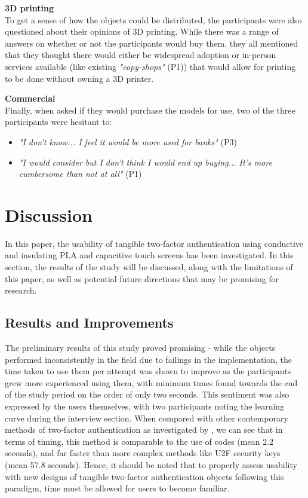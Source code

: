 \documentclass{l4proj}
\begin{document}
\textbf{3D printing}\\
To get a sense of how the objects could be distributed, the participants were also questioned about their opinions of 3D printing. While there was a range of answers on whether or not the participants would buy them, they all mentioned that they thought there would either be widespread adoption or in-person services available (like existing \textit{"copy-shops"} (P1)) that would allow for printing to be done without owning a 3D printer.

\textbf{Commercial}\\
Finally, when asked if they would purchase the models for use, two of the three participants were hesitant to:
\begin{itemize}
    \item \textit{"I don't know... I feel it would be more used for banks"} (P3)
    \item \textit{"I would consider but I don't think I would end up buying... It's more cumbersome than not at all"} (P1)
\end{itemize}

\chapter{Discussion} 

In this paper, the usability of tangible two-factor authentication using conductive and insulating PLA and capacitive touch screens has been investigated. In this section, the results of the study will be discussed, along with the limitations of this paper, as well as potential future directions that may be promising for research.

\section{Results and Improvements}

The preliminary results of this study proved promising - while the objects performed inconsistently in the field due to failings in the implementation, the time taken to use them per attempt was shown to improve as the participants grew more experienced using them, with minimum times found towards the end of the study period on the order of only two seconds. This sentiment was also expressed by the users themselves, with two participants noting the learning curve during the interview section. When compared with other contemporary methods of two-factor authentication as investigated by \cite{reese2019usability}, we can see that in terms of timing, this method is comparable to the use of codes (mean 2.2 seconds), and far faster than more complex methods like U2F security keys (mean 57.8 seconds). Hence, it should be noted that to properly assess usability with new designs of tangible two-factor authentication objects following this paradigm, time must be allowed for users to become familiar. 
\end{document}
